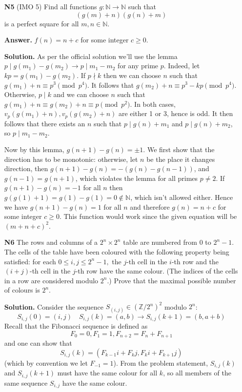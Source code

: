 \documentclass[11pt]{article}
\newcommand{\bbZ}{\mathbb Z}
\newcommand{\bbN}{\mathbb N}
\newcommand{\<}{\langle}
\renewcommand{\>}{\rangle}
\begin{document}
\begin{enumerate}
	\item [\textbf{N5}] (IMO 5) Find all functions $g:\mathbb{N}\rightarrow\mathbb{N}$ such that\[\left(g(m)+n\right)\left(g(n)+m\right)\]is a perfect square for all $m,n\in\mathbb{N}.$
	
	\textbf{Answer.} $f(n)=n+c$ for some integer $c\ge 0$. 
	
	\textbf{Solution.} 
	As per the official solution we'll use the lemma 
	$p\mid g(m_1)-g(m_2)\to p\mid m_1-m_2$ for any prime $p$. 
	Indeed, let $kp=g(m_1)-g(m_2)$. 
	If $p\nmid k$ then we can choose $n$ such that $g(m_1)+n\equiv p^3\pmod{p^4}$. 
	It follows that $g(m_2)+n\equiv p^3-kp\pmod{p^4}$. 
	Otherwise, $p\mid k$ and we can choose $n$ such that $g(m_1)+n\equiv g(m_2)+n\equiv p\pmod{p^2}$. 
	In both cases, $v_p(g(m_1)+n), v_p(g(m_2)+n)$ are either 1 or 3, hence is odd. 
	It then follows that there exists an $n$ such that $p\mid g(n)+m_1$ and $p\mid g(n)+m_2$, so $p\mid m_1-m_2$. 
	
	Now by this lemma, $g(n+1)-g(n)=\pm 1$. We first show that the direction has to be monotonic: 
	otherwise, let $n$ be the place it changes direction, then 
	$g(n+1)-g(n)=-(g(n)-g(n-1))$, and $g(n-1)=g(n+1)$, which violates the lemma for all primes $p\neq 2$. 
	If $g(n+1)-g(n)=-1$ for all $n$ then $g(g(1)+1)=g(1)-g(1)=0\not\in \bbN$, which isn't allowed either. 
	Hence we have $g(n+1)-g(n)=1$ for all $n$ and therefore 
	$g(n)=n+c$ for some integer $c\ge 0$. 
	This function would work since the given equation will be $(m+n+c)^2$. 
	
	\item[\textbf{N6}] The rows and columns of a $2^n \times 2^n$ table are numbered from $0$ to $2^{n}-1.$ The cells of the table have been coloured with the following property being satisfied: for each $0 \leq i,j \leq 2^n - 1,$ the $j$-th cell in the $i$-th row and the $(i+j)$-th cell in the $j$-th row have the same colour. (The indices of the cells in a row are considered modulo $2^n$.) Prove that the maximal possible number of colours is $2^n$.
	
	\textbf{Solution.} Consider the sequence $S_{(i, j)}\in (\bbZ/2^n)^2$ modulo $2^n$: 
	\[
	S_{i, j}(0)=(i, j)\quad S_{i, j}(k) = (a, b)\to S_{i, j}(k+1)=(b, a+b) 
	\]
	Recall that the Fibonacci sequence is defined as
	\[
	F_0=0, F_1=1, F_{n+2}=F_n+F_{n+1}
	\]
	and one can show that 
	\[
	S_{i, j}(k)=(F_{k-1}i+F_{k}j, F_{k}i+F_{k+1}j)
	\]
	(which by convention we let $F_{-1}=1$). 
	From the problem statement, $S_{i, j}(k)$ and $S_{i, j}(k+1)$ must have the same colour for all $k$, 
	so all members of the same sequence $S_{i, j}$ have the same colour. 
	

\end{enumerate}
\end{document}
